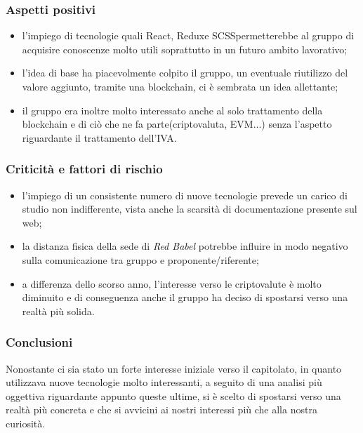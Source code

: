 \subsubsection{Aspetti positivi} 
\begin{itemize}
	\item l'impiego di tecnologie quali React\glo, Redux\glosp e SCSS\glosp permetterebbe al gruppo di acquisire conoscenze molto utili soprattutto in un futuro ambito lavorativo;	
	\item l'idea di base ha piacevolmente colpito il gruppo, un eventuale riutilizzo del valore aggiunto, tramite una blockchain\glo, ci è sembrata un idea allettante;	
	\item il gruppo era inoltre molto interessato anche al solo trattamento della blockchain e di ciò che ne fa parte(criptovaluta, EVM...) senza l'aspetto riguardante il trattamento dell'IVA.
\end{itemize}

\subsubsection{Criticità e fattori di rischio}
\begin{itemize}
	\item l'impiego di un consistente numero di nuove tecnologie prevede un carico di studio non indifferente, vista anche la scarsità di documentazione presente sul web;	
	\item la distanza fisica della sede di \textit{Red Babel} potrebbe influire in modo negativo sulla comunicazione tra gruppo e proponente/riferente; 	
	\item a differenza dello scorso anno, l'interesse verso le criptovalute è molto diminuito e di conseguenza anche il gruppo ha deciso di spostarsi verso una realtà più solida.  
\end{itemize}

\subsubsection{Conclusioni}
Nonostante ci sia stato un forte interesse iniziale verso il capitolato\glo, in quanto utilizzava nuove tecnologie molto interessanti, a seguito di una analisi più oggettiva riguardante appunto queste ultime, si è scelto di spostarsi verso una realtà più concreta e che si avvicini ai nostri interessi più che alla nostra curiosità.